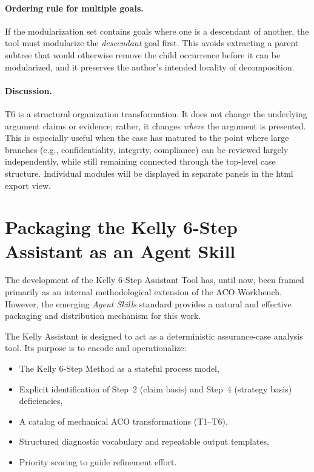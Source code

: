 \documentclass{article}
\begin{document}
\paragraph{Ordering rule for multiple goals.}
If the modularization set contains goals where one is a descendant of another, the tool must modularize the \emph{descendant} goal first.
This avoids extracting a parent subtree that would otherwise remove the child occurrence before it can be modularized, and it preserves the author's intended locality of decomposition.

\paragraph{Discussion.}
T6 is a structural organization transformation.
It does not change the underlying argument claims or evidence; rather, it changes \emph{where} the argument is presented.
This is especially useful when the case has matured to the point where large branches (e.g., confidentiality, integrity, compliance) can be reviewed largely independently, while still remaining connected through the top-level case structure.
Individual modules will be displayed in separate panels in the html export view.

\clearpage
\section{Packaging the Kelly 6-Step Assistant as an Agent Skill}

The development of the Kelly 6-Step Assistant Tool has, until now, been framed primarily as an internal methodological extension of the ACO Workbench. However, the emerging \emph{Agent Skills} standard provides a natural and effective packaging and distribution mechanism for this work.

The Kelly Assistant is designed to act as a deterministic assurance-case analysis tool. Its purpose is to encode and operationalize:

\begin{itemize}
  \item The Kelly 6-Step Method as a stateful process model,
  \item Explicit identification of Step~2 (claim basis) and Step~4 (strategy basis) deficiencies,
  \item A catalog of mechanical ACO transformations (T1--T6),
  \item Structured diagnostic vocabulary and repeatable output templates,
  \item Priority scoring to guide refinement effort.
\end{itemize}
\end{document}
